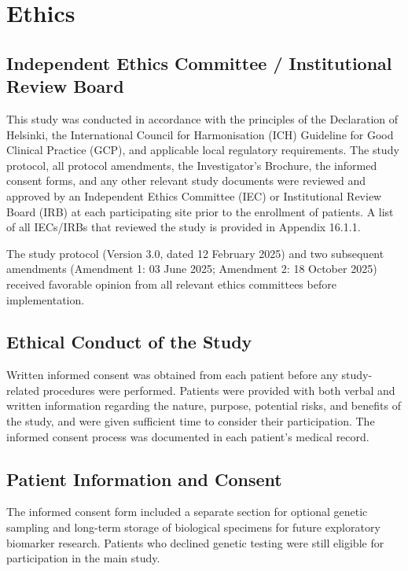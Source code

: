 \section{Ethics}

\subsection{Independent Ethics Committee / Institutional Review Board}

This study was conducted in accordance with the principles of the Declaration of Helsinki, the International Council for Harmonisation (ICH) Guideline for Good Clinical Practice (GCP), and applicable local regulatory requirements. The study protocol, all protocol amendments, the Investigator's Brochure, the informed consent forms, and any other relevant study documents were reviewed and approved by an Independent Ethics Committee (IEC) or Institutional Review Board (IRB) at each participating site prior to the enrollment of patients. A list of all IECs/IRBs that reviewed the study is provided in Appendix 16.1.1.

\begin{notebox}
The study protocol (Version 3.0, dated 12 February 2025) and two subsequent amendments (Amendment 1: 03 June 2025; Amendment 2: 18 October 2025) received favorable opinion from all relevant ethics committees before implementation.
\end{notebox}

\subsection{Ethical Conduct of the Study}

Written informed consent was obtained from each patient before any study-related procedures were performed. Patients were provided with both verbal and written information regarding the nature, purpose, potential risks, and benefits of the study, and were given sufficient time to consider their participation. The informed consent process was documented in each patient's medical record.

\subsection{Patient Information and Consent}

The informed consent form included a separate section for optional genetic sampling and long-term storage of biological specimens for future exploratory biomarker research. Patients who declined genetic testing were still eligible for participation in the main study.

\newpage

